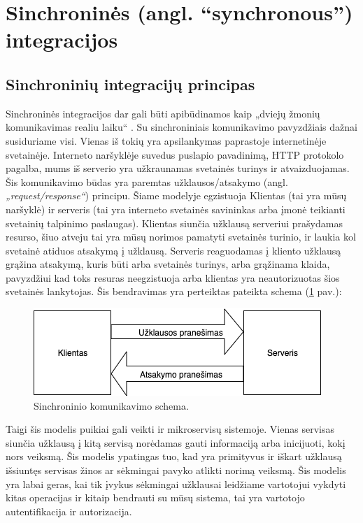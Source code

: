 \section{Sinchroninės (angl. “synchronous”) integracijos}

\subsection{Sinchroninių integracijų principas}
Sinchroninės integracijos dar gali būti apibūdinamos kaip „dviejų žmonių komunikavimas realiu laiku“ \cite{Bk6}. Su sinchroniniais komunikavimo pavyzdžiais dažnai susiduriame visi. Vienas iš tokių yra apsilankymas paprastoje internetinėje svetainėje.
Interneto naršyklėje suvedus puslapio pavadinimą, HTTP protokolo pagalba, mums iš serverio yra užkraunamas svetainės turinys ir atvaizduojamas.
Šis komunikavimo būdas yra paremtas užklausos/atsakymo (angl. \textit{„request/response“}) principu. Šiame modelyje egzistuoja
Klientas (tai yra mūsų naršyklė) ir serveris (tai yra interneto svetainės savininkas arba įmonė teikianti svetainių talpinimo paslaugas).
Klientas siunčia užklausą serveriui prašydamas resurso, šiuo atveju tai yra mūsų norimos pamatyti svetainės turinio, ir laukia kol svetainė atiduos atsakymą į užklausą.
Serveris reaguodamas į kliento užklausą grąžina atsakymą, kuris būti arba svetainės turinys, arba grąžinama klaida, pavyzdžiui kad toks resuras neegzistuoja arba 
klientas yra neautorizuotas šios svetainės lankytojas. Šis bendravimas yra perteiktas pateikta schema (\ref{img:synchronous-model} pav.):

\begin{figure}[H]
  \centering
  \includegraphics[scale=0.6]{img/synchronous-model}
  \caption{Sinchroninio komunikavimo schema.}
  \label{img:synchronous-model}
\end{figure}

Taigi šis modelis puikiai gali veikti ir mikroservisų sistemoje. Vienas servisas siunčia užklausą į kitą servisą norėdamas gauti
informaciją arba inicijuoti, kokį nors veiksmą. Šis modelis ypatingas tuo, kad yra primityvus ir iškart užklausą išsiuntęs servisas
žinos ar sėkmingai pavyko atlikti norimą veiksmą. Šis modelis yra labai geras, kai tik įvykus sėkmingai užklausai leidžiame vartotojui vykdyti
kitas operacijas ir kitaip bendrauti su mūsų sistema, tai yra vartotojo autentifikacija ir autorizacija.

